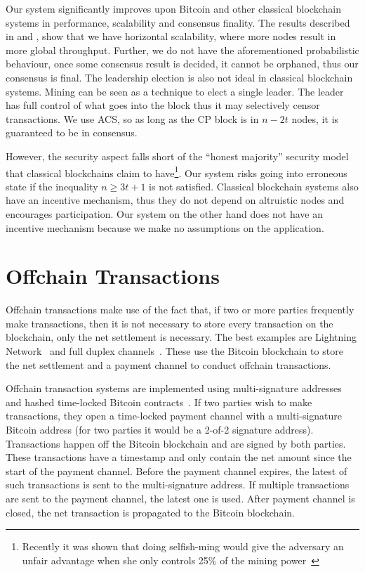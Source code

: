 Our system significantly improves upon Bitcoin and other classical blockchain systems in performance, scalability and consensus finality.
The results described in  and , show that we have horizontal scalability,
where more nodes result in more global throughput.
Further, we do not have the aforementioned probabilistic behaviour,
once some consensus result is decided, it cannot be orphaned, thus our consensus is final.
The leadership election is also not ideal in classical blockchain systems.
Mining can be seen as a technique to elect a single leader.
The leader has full control of what goes into the block thus it may selectively censor transactions.
We use ACS, so as long as the CP block is in $n - 2t$ nodes, it is guaranteed to be in consensus.

However, the security aspect falls short of the ``honest majority'' security model that classical blockchains claim to 
have\footnote{Recently it was shown that doing selfish-ming would give the adversary an unfair advantage when she only controls 25\% of the mining power~\cite{eyal2014majority}}.
Our system risks going into erroneous state if the inequality $n \ge 3t + 1$ is not satisfied.
Classical blockchain systems also have an incentive mechanism, thus they do not depend on altruistic nodes and encourages participation.
Our system on the other hand does not have an incentive mechanism because we make no assumptions on the application.

\section{Offchain Transactions}
Offchain transactions make use of the fact that, if two or more parties frequently make transactions,
then it is not necessary to store every transaction on the blockchain, only the net settlement is necessary.
The best examples are Lightning Network~\cite{lightningnetwork} and full duplex channels~\cite{decker2015fast}.
These use the Bitcoin blockchain to store the net settlement and a payment channel to conduct offchain transactions.

Offchain transaction systems are implemented using multi-signature addresses~\cite{bitcoinmultisig} and hashed time-locked Bitcoin contracts~\cite{bitcointimelock}.
If two parties wish to make transactions, they open a time-locked payment channel with a multi-signature Bitcoin address (for two parties it would be a 2-of-2 signature address).
Transactions happen off the Bitcoin blockchain and are signed by both parties.
These transactions have a timestamp and only contain the net amount since the start of the payment channel.
Before the payment channel expires, the latest of such transactions is sent to the multi-signature address.
If multiple transactions are sent to the payment channel, the latest one is used.
After payment channel is closed, the net transaction is propagated to the Bitcoin blockchain.

